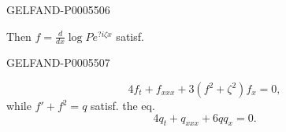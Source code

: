 \begin{GelfandAdjacentEvidence}{GELFAND-P000550}{6}


Then \(f=\frac{d}{dx}\log P e^{?i\zeta x}\) satisf.
\end{GelfandAdjacentEvidence}
\begin{GelfandAdjacentEvidence}{GELFAND-P000550}{7}

\[
4f_t+f_{xxx}+3(f^2+\zeta^2)f_x=0,
\]
while \(f'+f^2=q\) satisf. the eq.
\[
4q_t+q_{xxx}+6qq_x=0.
\]
\end{GelfandAdjacentEvidence}




